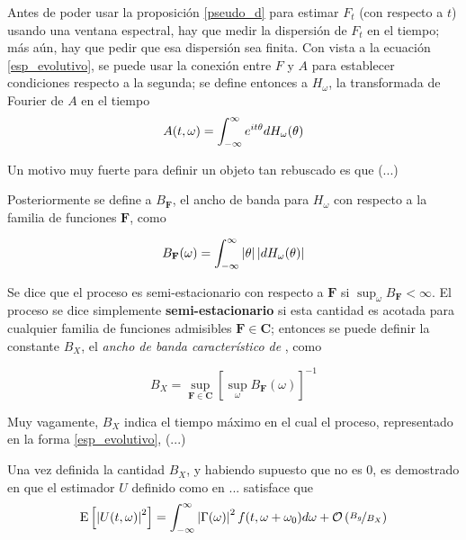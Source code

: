 Antes de poder usar la proposición \ref{pseudo_d} para estimar $F_t$ (con respecto a $t$) usando 
una ventana espectral, hay que medir la dispersión de $F_t$ en el tiempo; más aún, hay que
pedir que esa dispersión sea finita.
Con vista a la ecuación \ref{esp_evolutivo}, se puede usar la conexión entre $F$ y $A$ para
establecer condiciones respecto a la segunda; se define entonces a $H_\omega$, la transformada de
Fourier de $A$ en el tiempo
\begin{equation}
A(t,\omega) = \int_{-\infty}^{\infty} e^{i t \theta} dH_\omega(\theta)
\end{equation}

Un motivo muy fuerte para definir un objeto tan rebuscado es que (...)
%

Posteriormente se define a $B_{\mathbf{F}}$, el ancho de banda para $H_\omega$ con respecto a la 
familia de funciones $\mathbf{F}$, como

\begin{equation}
B_{\mathbf{F}}(\omega) = \int_{-\infty}^{\infty} \left| \theta \right| \left| dH_\omega(\theta) \right|
\end{equation}

Se dice que el proceso es semi-estacionario con respecto a $\mathbf{F}$ si 
$\sup_\omega B_{\mathbf{F}} < \infty$. El proceso se dice simplemente \textbf{semi-estacionario} 
si esta cantidad es acotada para cualquier familia de funciones admisibles 
$\mathbf{F} \in \mathbf{C}$; entonces se puede definir la constante $B_X$,
el \textit{ancho de banda característico de} \xt, como

\begin{equation}
B_X = \sup_{\mathbf{F}\in \mathbf{C}} \left[ \sup_\omega B_{\mathbf{F}}(\omega) \right]^{-1}
\end{equation}

Muy vagamente, $B_X$ indica el tiempo máximo en el cual el proceso, representado en la forma
\ref{esp_evolutivo}, (...)

Una vez definida la cantidad $B_X$, y habiendo supuesto que no es 0, es demostrado en
\cite{Priestley65} que el estimador $U$ definido como en ...
satisface que
\begin{equation}
\mathrm{E}\left[ \left| U(t,\omega) \right|^{2} \right] = \int_{-\infty}^{\infty} \left| \Gamma(\omega) \right|^{2} f(t,\omega+\omega_0) d\omega
+ \mathcal{O}\left( \nicefrac{B_g}{B_X} \right)
\end{equation}

